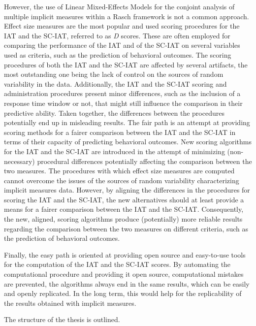 \documentclass[12pt]{book}
\begin{document}
However, the use of Linear Mixed-Effects Models for the conjoint analysis of multiple implicit measures within a Rasch framework is not a common approach. 
Effect size measures are the most popular and used scoring procedures for the IAT and the SC-IAT, referred to as \emph{D} scores.  
These are often employed for comparing the performance of the IAT and of the SC-IAT on several variables used as criteria, such as the prediction of behavioral outcomes. 
The scoring procedures of both the IAT and the SC-IAT are affected by several artifacts, the most outstanding one being the lack of control on the sources of random variability in the data. 
Additionally, the IAT and the SC-IAT scoring and  administration procedures present minor differences, such as the inclusion of a response time window or not, that might still influence the comparison in their predictive ability. 
Taken together, the differences between the procedures potentially end up in misleading results.
The fair path is an attempt at providing scoring methods for a fairer comparison between the IAT and the SC-IAT in terms of their capacity of predicting behavioral outcomes. 
New scoring algorithms for the IAT and the SC-IAT are introduced in the attempt of minimizing (non-necessary) procedural differences potentially affecting the comparison between the two measures.
The procedures with which effect size measures are computed cannot overcome the issues of the sources of random variability characterizing implicit measures data. 
However, by aligning the differences in the procedures for scoring the IAT and the SC-IAT, the new alternatives should at least provide a means for a fairer comparison between the IAT and the SC-IAT. 
Consequently, the new, aligned, scoring algorithms produce (potentially) more reliable results regarding the comparison between the two measures on different criteria, such as the prediction of behavioral outcomes.

Finally, the easy path is oriented at providing open source and easy-to-use tools for the computation of the IAT and the SC-IAT scores. By automating the computational procedure and providing it open source, computational mistakes are prevented, the algorithms always end in the same results, which can be easily and openly replicated. In the long term, this would help for the replicability of the results obtained with implicit measures.

The structure of the thesis is outlined.
\end{document}
